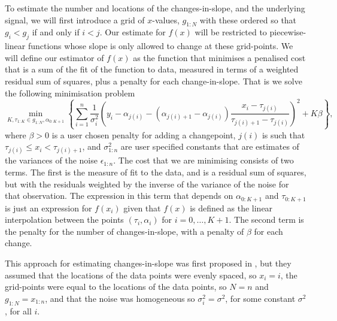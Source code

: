 \documentclass[article]{jss}
\begin{document}
To estimate the number and locations of the changes-in-slope, and the underlying signal, we will first introduce a grid of $x$-values, $g_{1:N}$ with these ordered so that $g_i<g_j$ if and only if $i<j$. Our estimate for $f(x)$ will be restricted to piecewise-linear functions whose slope is only allowed to change at these grid-points. We will define our estimator of $f(x)$ as the function that minimises a penalised cost that is a sum of the fit of the function to data, measured in terms of a weighted residual sum of squares, plus a penalty for each change-in-slope. That is we solve the following minimisation problem
\begin{equation} \label{eq:penalised_cost}
\min_{K,\tau_{1:K}\in g_{1:N}, \alpha_{0:K+1} } \left\{
\sum_{i=1}^n \frac{1}{\sigma^2_i} \left(y_i -  \alpha_{j(i)}-(\alpha_{j(i)+1}-  \alpha_{j(i)})\frac{x_i-\tau_{j(i)}}{\tau_{j(i)+1}-\tau_{j(i)}}   \right)^2
+K\beta
\right\},
\end{equation}
where $\beta>0$ is a user chosen penalty for adding a changepoint, $j(i)$ is such that $\tau_{j(i)}\leq x_i < \tau_{j(i)+1}$, and $\sigma^2_{1:n}$ are user specified constants that are estimates of the variances of the noise $\epsilon_{1:n}$. The cost that we are minimising consists of two terms. The first is the measure of fit to the data, and is a residual sum of squares, but with the residuals weighted by the inverse of the variance of the noise for that observation. The expression in this term that depends on $\alpha_{0:K+1}$ and $\tau_{0:K+1}$ is just an expression for $f(x_i)$ given that $f(x)$ is defined as the linear interpolation between the points $(\tau_i,\alpha_i)$ for $i=0,\ldots,K+1$. The second term is the penalty for the number of changes-in-slope, with a penalty of $\beta$ for each change.

This approach for estimating changes-in-slope was first proposed in \cite{fearnhead2019detecting}, but they assumed that the locations of the data points were evenly spaced, so $x_i=i$, the grid-points were equal to the locations of the data points, so $N=n$ and $g_{1:N}=x_{1:n}$, and that the noise was homogeneous so $\sigma^2_i=\sigma^2$, for some constant $\sigma^2$, for all $i$. 
\end{document}
